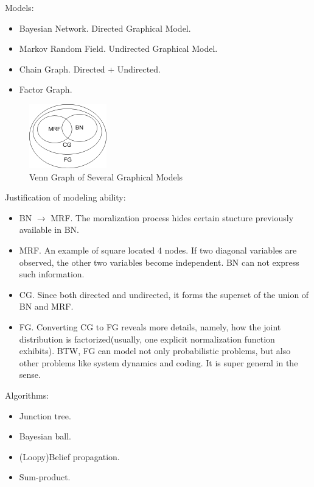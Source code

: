 \documentclass[11pt,a4paper]{article}
\begin{document}
Models:
\begin{itemize}
	\item Bayesian Network. Directed Graphical Model. 
	\item Markov Random Field. Undirected Graphical Model.
	\item Chain Graph. Directed + Undirected.  
	\item Factor Graph. 
\end{itemize}

\begin{figure}[htb]
\centering
	\includegraphics[width=0.3\textwidth]{illustration/graphical-venn.png}
	\caption{Venn Graph of Several Graphical Models}
\end{figure}

Justification of modeling ability:
\begin{itemize}
	\item BN $\rightarrow$ MRF. The moralization process hides certain stucture 
	previously available in BN. 
	\item MRF. An example of square located 4 nodes. If two diagonal variables 
	are observed, the other two variables become independent. BN can not express 
	such information. 
	\item CG. Since both directed and undirected, it forms the superset of 
	the union of BN and	MRF.
	\item FG. Converting CG to FG reveals more details, namely, how the joint 
	distribution is factorized(usually, one explicit normalization function 
	exhibits). BTW, FG can model not only probabilistic problems, but also 
	other problems like system dynamics and coding. It is super general in the
	sense.
\end{itemize}


Algorithms:
\begin{itemize}
	\item Junction tree. 
	\item Bayesian ball. 
	\item (Loopy)Belief propagation. 
	\item Sum-product. 
\end{itemize}
\end{document}
